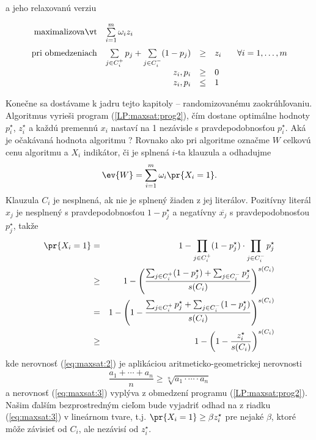 \noindent
a jeho relaxovanú verziu

\begin{equation}
\label{LP:maxsat:prog2}
\begin{array}{rrcll}
{\rm maximalizovať}     & \multicolumn{1}{l}{ \sum\limits_{i=1}^m\omega_iz_i}\\[3ex]
{\rm pri\ obmedzeniach} & \sum\limits_{j\in C_i^+}p_j + \sum\limits_{j\in C_i^-}(1-p_j) &\ge&z_i& \;\;\;
                            \forall i=1,\ldots,m \\
                        & z_i,p_i&\ge&0\\
                        & z_i,p_i&\le&1\\
\end{array}
\end{equation}

\noindent
Konečne sa dostávame k jadru tejto kapitoly -- randomizovanému zaokrúhľovaniu. Algoritmus 
vyrieši program 
(\ref{LP:maxsat:prog2}), čím dostane optimálne hodnoty $p_i^\star$, $z_i^\star$  a každú premennú $x_i$ 
nastaví na 1 nezávisle s pravdepodobnosťou $p_i^\star$.
Aká je očakávaná hodnota algoritmu ? Rovnako ako pri algoritme  označme $W$
celkovú cenu algoritmu a $X_i$ indikátor, či je splnená $i$-ta klauzula a odhadujme
$$\ev{W}
=\sum_{i=1}^m\omega_i\pr{X_i=1}.$$
Klauzula $C_i$ je nesplnená, ak nie je splnený žiaden z jej literálov. Pozitívny literál $x_j$
je nesplnený s pravdepodobnosťou $1-p_j^\star$ a negatívny $\overline{x_j}$ s pravdepodobnosťou 
$p_j^\star$, takže 
\begin{eqnarray}
\label{eq:maxsat:1}\pr{X_i=1}&=&1-\prod_{j\in C_i^+}(1-p_j^\star)\cdot\prod_{j\in C_i^-}p_j^\star\\
\label{eq:maxsat:2}&\ge&1-\left(\frac{\sum_{j\in C_i^+}(1-p_j^\star)+\sum_{j\in C_i^-}p_j^\star}{s(C_i)}\right)^{s(C_i)}\\
&=&1-\left(1-\frac{\sum_{j\in C_i^+}p_j^\star+\sum_{j\in C_i^-}(1-p_j^\star)}{s(C_i)}\right)^{s(C_i)}\notag\\
\label{eq:maxsat:3}&\ge&1-\left(1-\frac{z_i^\star}{s(C_i)}\right)^{s(C_i)}
\end{eqnarray}
kde nerovnosť (\ref{eq:maxsat:2}) je aplikáciou aritmeticko-geometrickej nerovnosti
$$\frac{a_1+\cdots+a_n}{n}\ge\sqrt[n]{a_1\cdot\cdots\cdot a_n}$$
a nerovnosť (\ref{eq:maxsat:3})
vyplýva z obmedzení programu (\ref{LP:maxsat:prog2}). Našim ďalším bezprostredným cieľom bude 
vyjadriť odhad na  z riadku (\ref{eq:maxsat:3}) v lineárnom tvare, t.j.
$\pr{X_i=1}\ge\beta z_i^\star$ pre nejaké $\beta$, ktoré môže závisieť od $C_i$, ale nezávisí od $z_i^\star$.
